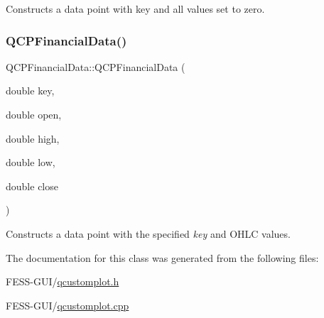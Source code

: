 Constructs a data point with key and all values set to zero. \hypertarget{class_q_c_p_financial_data_a069b72c514dfd4fc8e1d5df811e54ca4}{}\label{class_q_c_p_financial_data_a069b72c514dfd4fc8e1d5df811e54ca4} 
\subsubsection{\texorpdfstring{Q\+C\+P\+Financial\+Data()}{QCPFinancialData()}\hspace{0.1cm}{\footnotesize\ttfamily [2/2]}}
{\footnotesize\ttfamily Q\+C\+P\+Financial\+Data\+::\+Q\+C\+P\+Financial\+Data (\begin{DoxyParamCaption}\item[{double}]{key,  }\item[{double}]{open,  }\item[{double}]{high,  }\item[{double}]{low,  }\item[{double}]{close }\end{DoxyParamCaption})}

Constructs a data point with the specified {\itshape key} and O\+H\+LC values. 

The documentation for this class was generated from the following files\+:\begin{DoxyCompactItemize}
\item 
F\+E\+S\+S-\/\+G\+U\+I/\hyperlink{qcustomplot_8h}{qcustomplot.\+h}\item 
F\+E\+S\+S-\/\+G\+U\+I/\hyperlink{qcustomplot_8cpp}{qcustomplot.\+cpp}\end{DoxyCompactItemize}
